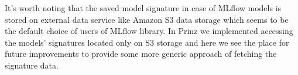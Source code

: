It’s worth noting that the saved model signature in case of MLflow models is stored on external data
service like Amazon S3 data storage which seems to be the default choice of users of MLflow library.
In Prinz we implemented accessing the models’ signatures located only on S3 storage and here we see
the place for future improvements to provide some more generic approach of fetching the signature data.
